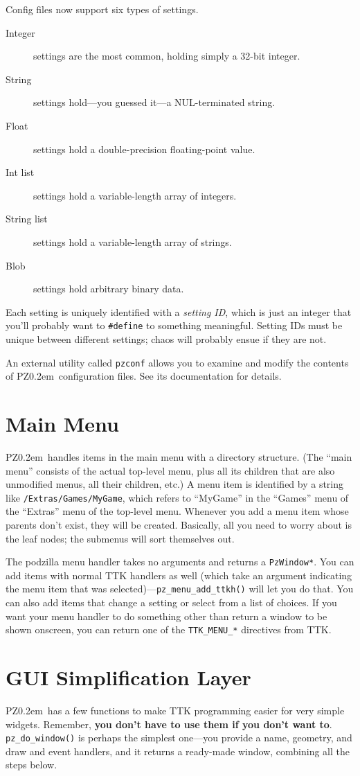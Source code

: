 \documentclass[12pt,letterpaper]{report}
\def\pz{{\footnotesize PZ}}
\def\pzt{\pz\kern0.2em{\large\oldstyle2}}
\begin{document}
Config files now support six types of settings.
\begin{description}
\item[Integer] settings are the most common, holding simply a 32-bit integer.
\item[String] settings hold---you guessed it---a NUL-terminated string.
\item[Float] settings hold a double-precision floating-point value.
\item[Int list] settings hold a variable-length array of integers.
\item[String list] settings hold a variable-length array of strings.
\item[Blob] settings hold arbitrary binary data.
\end{description}
Each setting is uniquely identified with a {\sl setting ID}, which is just an integer that
you'll probably want to \verb|#define| to something meaningful. Setting IDs must be unique
between different settings; chaos will probably ensue if they are not.

An external utility called \verb|pzconf| allows you to examine and modify the contents of
\pzt\ configuration files. See its documentation for details.

\section{Main Menu}
\pzt\ handles items in the main menu with a directory structure. (The ``main menu'' consists
of the actual top-level menu, plus all its children that are also unmodified menus, all their
children, etc.) A menu item is identified by a string like \verb|/Extras/Games/MyGame|, which
refers to ``MyGame'' in the ``Games'' menu of the ``Extras'' menu of the top-level menu.
Whenever you add a menu item whose parents don't exist, they will be created. Basically, all
you need to worry about is the leaf nodes; the submenus will sort themselves out.

The podzilla menu handler takes no arguments and returns a \verb|PzWindow*|. You can add items with
normal TTK handlers as well (which take an argument indicating the menu item that was
selected)---\verb|pz_menu_add_ttkh()| will let you do that. You can also add items that change
a setting or select from a list of choices. If you want your menu handler to do something
other than return a window to be shown onscreen, you can return one of the \verb|TTK_MENU_*| directives
from TTK.

\section{GUI Simplification Layer}
\pzt\ has a few functions to make TTK programming easier for very simple widgets.
Remember, {\bf you don't have to use them if you don't want to}.
\verb|pz_do_window()| is perhaps the simplest one---you provide a name, geometry, and
draw and event handlers, and it returns a ready-made window, combining all the steps below.
\end{document}
